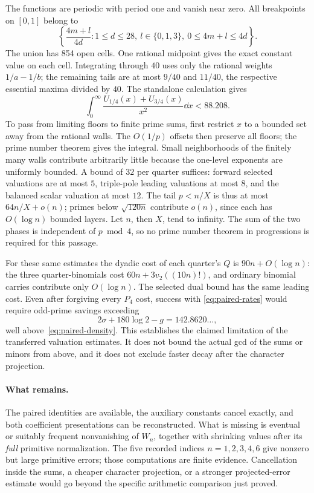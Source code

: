The functions are periodic with period one and vanish near zero.
All breakpoints on $[0,1]$ belong to
\[
 \left\{\frac{4m+l}{4d}:1\leq d\leq28,\ l\in\{0,1,3\},\
                         0\leq4m+l\leq4d\right\}.
\]
The union has 854 open cells. One rational midpoint gives the exact
constant value on each cell. Integrating through $40$ uses only the
rational weights $1/a-1/b$; the remaining tails are at most $9/40$
and $11/40$, the respective essential maxima divided by $40$.
The standalone calculation  gives
\begin{equation}\label{eq:paired-density}
 \int_0^\infty\frac{U_{1/4}(x)+U_{3/4}(x)}{x^2}\dd x
                        <88.208.
\end{equation}
To pass from limiting floors to finite prime sums, first restrict $x$
to a bounded set away from the rational walls. The $O(1/p)$ offsets
then preserve all floors; the prime number theorem gives the integral.
Small neighborhoods of the finitely many walls contribute arbitrarily
little because the one-level exponents are uniformly bounded. A bound
of $32$ per quarter suffices: forward selected valuations are at most
$5$, triple-pole leading valuations at most $8$, and the balanced scalar
valuation at most $12$. The tail $p<n/X$ is thus at most $64n/X+o(n)$;
primes below $\sqrt{120n}$ contribute $o(n)$, since each has $O(\log n)$
bounded layers. Let $n$, then $X$, tend to infinity. The sum of the two
phases is independent of $p\bmod4$, so no prime number theorem in
progressions is required for this passage.

For these same estimates the dyadic cost of each quarter's $Q$ is
$90n+O(\log n)$: the three quarter-binomials cost
$60n+3v_2((10n)!)$, and ordinary binomial carries contribute only
$O(\log n)$. The selected dual bound has the same leading cost.
Even after forgiving every $P_4$ cost, success with
\eqref{eq:paired-rates} would require odd-prime savings exceeding
\[
 2\sigma+180\log2-g=142.8620\ldots,
\]
well above~\eqref{eq:paired-density}. This establishes the claimed
limitation of the transferred valuation estimates. It does not bound
the actual gcd of the sums or minors from above, and it does not
exclude faster decay after the character projection.

\paragraph{What remains.}
The paired identities are available, the auxiliary constants cancel
exactly, and both coefficient presentations can be reconstructed.
What is missing is eventual or suitably frequent nonvanishing of
$W_n$, together with shrinking values after its \emph{full} primitive
normalization. The five recorded indices $n=1,2,3,4,6$ give nonzero
but large primitive errors; those computations are finite evidence.
Cancellation inside the sums, a cheaper character projection, or a
stronger projected-error estimate would go beyond the specific
arithmetic comparison just proved.

